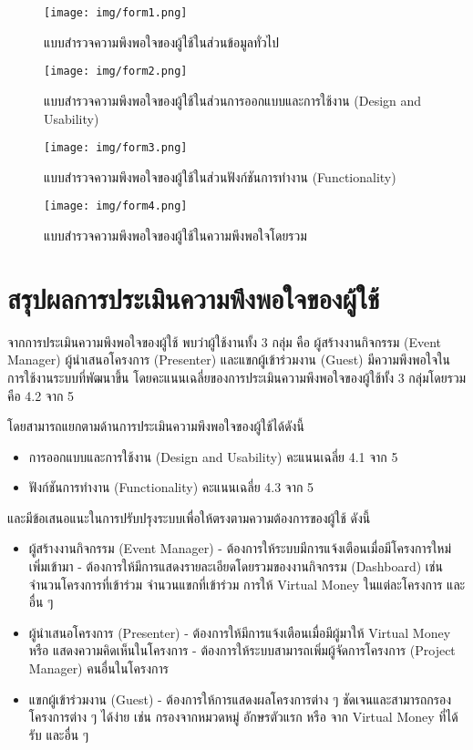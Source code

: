 \begin{figure}
    \centering
    \texttt{[image: img/form1.png]}
    \caption{แบบสำรวจความพึงพอใจของผู้ใช้ในส่วนข้อมูลทั่วไป}
    \label{fig:survey1}
\end{figure}

\begin{figure}
    \centering
    \texttt{[image: img/form2.png]}
    \caption{แบบสำรวจความพึงพอใจของผู้ใช้ในส่วนการออกแบบและการใช้งาน (Design and Usability)}
    \label{fig:survey2}
\end{figure}

\begin{figure}
    \centering
    \texttt{[image: img/form3.png]}
    \caption{แบบสำรวจความพึงพอใจของผู้ใช้ในส่วนฟังก์ชันการทำงาน (Functionality)}
    \label{fig:survey3}
\end{figure}

\begin{figure}
    \centering
    \texttt{[image: img/form4.png]}
    \caption{แบบสำรวจความพึงพอใจของผู้ใช้ในความพึงพอใจโดยรวม}
    \label{fig:survey4}
\end{figure}

\clearpage %
\section{สรุปผลการประเมินความพึงพอใจของผู้ใช้}
จากการประเมินความพึงพอใจของผู้ใช้ พบว่าผู้ใช้งานทั้ง 3 กลุ่ม คือ
ผู้สร้างงานกิจกรรม (Event Manager) ผู้นำเสนอโครงการ (Presenter)
และแขกผู้เข้าร่วมงาน (Guest) มีความพึงพอใจในการใช้งานระบบที่พัฒนาขึ้น
โดยคะแนนเฉลี่ยของการประเมินความพึงพอใจของผู้ใช้ทั้ง 3 กลุ่มโดยรวม คือ 4.2
จาก 5


โดยสามารถแยกตามด้านการประเมินความพึงพอใจของผู้ใช้ได้ดังนี้
\begin{itemize}
    \item การออกแบบและการใช้งาน (Design and Usability) คะแนนเฉลี่ย 4.1 จาก 5
    \item ฟังก์ชันการทำงาน (Functionality) คะแนนเฉลี่ย 4.3 จาก 5
\end{itemize}

และมีข้อเสนอแนะในการปรับปรุงระบบเพื่อให้ตรงตามความต้องการของผู้ใช้ ดังนี้
\begin{itemize}
    \item ผู้สร้างงานกิจกรรม (Event Manager)
          \subitem - ต้องการให้ระบบมีการแจ้งเตือนเมื่อมีโครงการใหม่เพิ่มเข้ามา
          \subitem - ต้องการให้มีการแสดงรายละเอียดโดยรวมของงานกิจกรรม (Dashboard) เช่น จำนวนโครงการที่เข้าร่วม จำนวนแขกที่เข้าร่วม การให้ Virtual Money ในแต่ละโครงการ และอื่น ๆ
    \item ผู้นำเสนอโครงการ (Presenter)
          \subitem - ต้องการให้มีการแจ้งเตือนเมื่อมีผู้มาให้ Virtual Money หรือ แสดงความคิดเห็นในโครงการ
          \subitem - ต้องการให้ระบบสามารถเพิ่มผู้จัดการโครงการ (Project Manager) คนอื่นในโครงการ
    \item แขกผู้เข้าร่วมงาน (Guest)
          \subitem - ต้องการให้การแสดงผลโครงการต่าง ๆ ชัดเจนและสามารถกรองโครงการต่าง ๆ ได้ง่าย เช่น กรองจากหมวดหมู่ อักษรตัวแรก หรือ จาก Virtual Money ที่ได้รับ และอื่น ๆ
\end{itemize}
